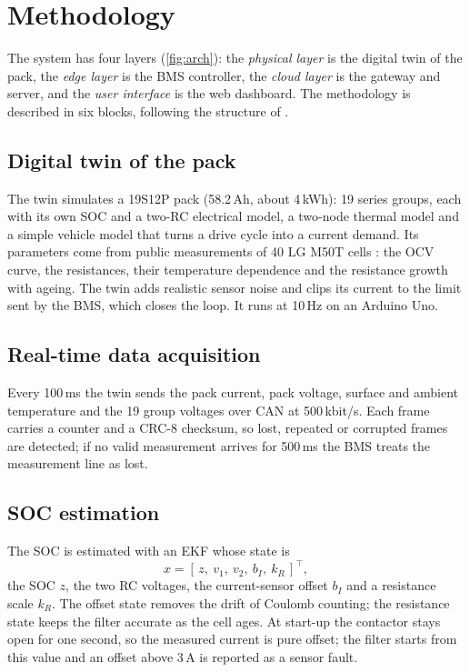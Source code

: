 \chapter{Methodology}\label{ch:method}

The system has four layers (\cref{fig:arch}): the \emph{physical layer} is the digital twin of the pack, the \emph{edge layer} is the BMS controller, the \emph{cloud layer} is the gateway and server, and the \emph{user interface} is the web dashboard. The methodology is described in six blocks, following the structure of \citet{nejakar2025}.


\section{Digital twin of the pack}
The twin simulates a 19S12P pack (58.2\,Ah, about 4\,kWh): 19 series groups, each with its own SOC and a two-RC electrical model, a two-node thermal model and a simple vehicle model that turns a drive cycle into a current demand. Its parameters come from public measurements of 40 LG M50T cells \citep{kirkaldy2024}: the OCV curve, the resistances, their temperature dependence and the resistance growth with ageing. The twin adds realistic sensor noise and clips its current to the limit sent by the BMS, which closes the loop. It runs at 10\,Hz on an Arduino Uno.

\section{Real-time data acquisition}
Every 100\,ms the twin sends the pack current, pack voltage, surface and ambient temperature and the 19 group voltages over CAN at 500\,kbit/s. Each frame carries a counter and a CRC-8 checksum, so lost, repeated or corrupted frames are detected; if no valid measurement arrives for 500\,ms the BMS treats the measurement line as lost.

\section{SOC estimation}
The SOC is estimated with an EKF whose state is
\begin{equation}
  x = [\,z,\ v_1,\ v_2,\ b_I,\ k_R\,]^\top,
\end{equation}
the SOC $z$, the two RC voltages, the current-sensor offset $b_I$ and a resistance scale $k_R$. The offset state removes the drift of Coulomb counting; the resistance state keeps the filter accurate as the cell ages. At start-up the contactor stays open for one second, so the measured current is pure offset; the filter starts from this value and an offset above 3\,A is reported as a sensor fault.


